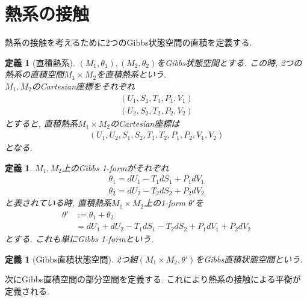 \documentclass[a4paper,12pt]{ltjsarticle}
\theoremstyle{break}
\newtheorem{defn}[thm]{定義}
\newcommand{\ti}{\times}
\numberwithin{equation}{section}
\begin{document}
\newpage

\section{熱系の接触}

熱系の接触を考えるために2つのGibbs状態空間の直積を定義する. 

\begin{defn}[直積熱系]
  $(M_1,\theta_1), (M_2,\theta_2)$をGibbs状態空間とする. 
  この時, 2つの熱系の直積空間$M_1 \ti M_2$を直積熱系という.　\\  
  $M_1,M_2$のCartesian座標をそれぞれ
  \begin{align*}
    (U_1,S_1,T_1,P_1,V_1) \\
    (U_2,S_2,T_2,P_2,V_2)
  \end{align*}
  とすると, 直積熱系$M_1 \ti M_2$のCartesian座標は
  \begin{align*}
    (U_1,U_2,S_1,S_2,T_1,T_2,P_1,P_2,V_1,V_2)
  \end{align*}
  となる. 
\end{defn} 

\begin{defn}
  $M_1,M_2$上のGibbs 1-formがそれぞれ
  \begin{align*}
    \theta_1
    = dU_1 - T_1dS_1 + P_1dV_1 \\
    \theta_2
    = dU_2 - T_2dS_2 + P_2dV_2
  \end{align*}
  と表されている時, 直積熱系$M_1 \ti M_2$上の1-form $\theta'$を
  \begin{align*}
    \theta'
    &:= \theta_1 + \theta_2 \\
    &= dU_1 + dU_2 - T_1dS_1 - T_2dS_2 + P_1dV_1 + P_2dV_2
  \end{align*}
  とする. 
  これも単にGibbs 1-formという. 
\end{defn}
  
\begin{defn}[Gibbs直積状態空間]
  2つ組$(M_1 \ti M_2,\theta')$をGibbs直積状態空間という. 
\end{defn}

次にGibbs直積空間の部分空間を定義する. 
これにより熱系の接触による平衡が定義される.
\end{document}
